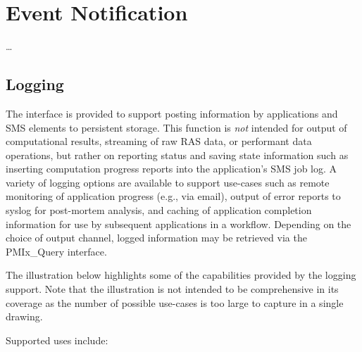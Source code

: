 \chapter{Event Notification}
\label{chap:api_event}

\ldots


\section{Logging}
\label{chap:api_event:logging}

\par
The  interface is provided to support posting information by applications and \ac{SMS} elements to persistent storage. This function is \emph{not} intended for output of computational results, streaming of raw \ac{RAS} data, or performant data operations, but rather on reporting status and saving state information such as inserting computation progress reports into the application's SMS job log. A variety of logging options are available to support use-cases such as remote monitoring of application progress (e.g., via email), output of error reports to syslog for post-mortem analysis, and caching of application completion information for use by subsequent applications in a workflow. Depending on the choice of output channel, logged information may be retrieved via the PMIx_Query interface.

\par
The illustration below highlights some of the capabilities provided by the logging support. Note that the illustration is not intended to be comprehensive in its coverage as the number of possible use-cases is too large to capture in a single drawing.


\par
Supported uses include:

